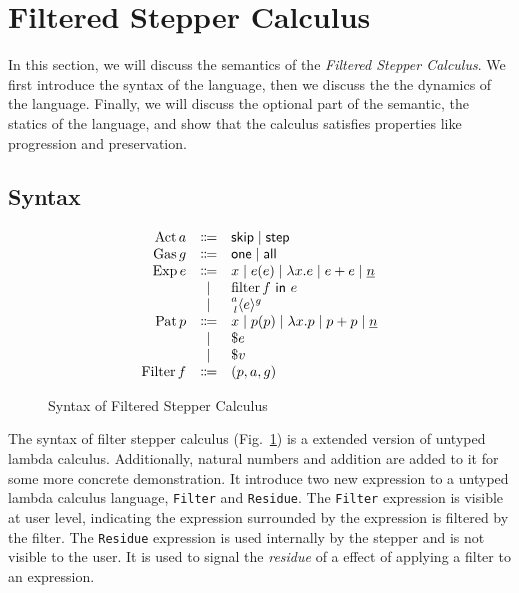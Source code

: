 \section{Filtered Stepper Calculus}

In this section, we will discuss the semantics of the \emph{Filtered Stepper
Calculus}. We first introduce the syntax of the language, then we discuss the
the dynamics of the language. Finally, we will discuss the optional part of the
semantic, the statics of the language, and show that the calculus satisfies
properties like progression and preservation.


\subsection{Syntax}

\begin{figure}[h]
  \begin{equation*}
    \begin{array}{rcl}
      \DefAct a    &\Coloneqq& \ActSkip \mid \ActStep \\
      \DefGas g    &\Coloneqq& \GasOne \mid \GasAll \\
      \DefExp e    &\Coloneqq& x \mid e(e) \mid \Lam{x}{e} \mid e + e \mid \Nat{n} \\
                   &\mid     & \Filter{f}{e} \\
                   &\mid     & \Residue{a}{g}{l}{e} \\
      \DefPat p    &\Coloneqq& x \mid p(p) \mid \Lam{x}{p} \mid p + p \mid \Nat{n} \\
                   &\mid     & \$e \\
                   &\mid     & \$v \\
      \DefFilter f &\Coloneqq& (p, a, g) \\
    \end{array}
  \end{equation*}
  \caption{Syntax of Filtered Stepper Calculus}
  \label{fig:filter-syntax}
\end{figure}


The syntax of filter stepper calculus (Fig.~\ref{fig:filter-syntax}) is a
extended version of untyped lambda calculus. Additionally, natural numbers and
addition are added to it for some more concrete demonstration. It introduce two
new expression to a untyped lambda calculus language, \texttt{Filter} and
\texttt{Residue}. The \texttt{Filter} expression is visible at user level,
indicating the expression surrounded by the expression is filtered by the
filter. The \texttt{Residue} expression is used internally by the stepper and is
not visible to the user. It is used to signal the \emph{residue} of a effect of
applying a filter to an expression.

